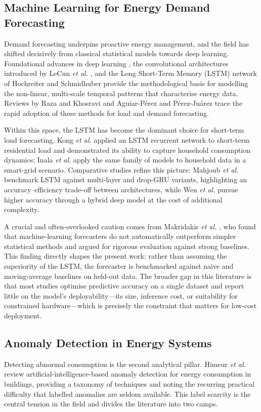 \documentclass[conference]{IEEEtran}
\begin{document}
\subsection{Machine Learning for Energy Demand Forecasting}
Demand forecasting underpins proactive energy management, and the field has
shifted decisively from classical statistical models towards deep learning.
Foundational advances in deep learning \cite{lecun2015deep,goodfellow2016deep},
the convolutional architectures introduced by LeCun \textit{et al.}
\cite{lecun1998gradient}, and the Long Short-Term Memory (LSTM) network of
Hochreiter and Schmidhuber \cite{hochreiter1997long} provide the methodological
basis for modelling the non-linear, multi-scale temporal patterns that
characterise energy data. Reviews by Raza and Khosravi \cite{raza2015review} and
Aguiar-P\'erez and P\'erez-Ju\'arez \cite{aguiar2023insight} trace the rapid
adoption of these methods for load and demand forecasting.
 
Within this space, the LSTM has become the dominant choice for short-term load
forecasting. Kong \textit{et al.} \cite{kong2017short} applied an LSTM
recurrent network to short-term residential load and demonstrated its ability to
capture household consumption dynamics; Inala \textit{et al.}
\cite{inala2025enhancing} apply the same family of models to household data in a
smart-grid scenario. Comparative studies refine this picture: Mahjoub
\textit{et al.} \cite{mahjoub2022predicting} benchmark LSTM against multi-layer
and drop-GRU variants, highlighting an accuracy--efficiency trade-off between
architectures, while Wen \textit{et al.} \cite{wen2024deep} pursue higher
accuracy through a hybrid deep model at the cost of additional complexity.
 
A crucial and often-overlooked caution comes from Makridakis \textit{et al.}
\cite{makridakis2018statistical}, who found that machine-learning forecasters do
not automatically outperform simpler statistical methods and argued for rigorous
evaluation against strong baselines. This finding directly shapes the present
work: rather than assuming the superiority of the LSTM, the forecaster is
benchmarked against naive and moving-average baselines on held-out data. The
broader gap in this literature is that most studies optimise predictive accuracy
on a single dataset and report little on the model's deployability---its size,
inference cost, or suitability for constrained hardware---which is precisely the
constraint that matters for low-cost deployment.
 
\subsection{Anomaly Detection in Energy Systems}
Detecting abnormal consumption is the second analytical pillar. Himeur
\textit{et al.} \cite{himeur2021artificial} review artificial-intelligence-based
anomaly detection for energy consumption in buildings, providing a taxonomy of
techniques and noting the recurring practical difficulty that labelled anomalies
are seldom available. This label scarcity is the central tension in the field
and divides the literature into two camps.
 
\end{document}
